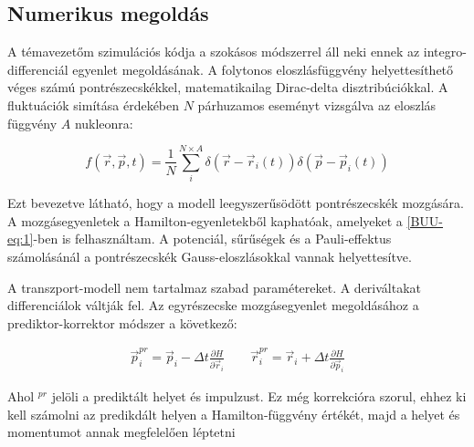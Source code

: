 \documentclass[a4paper,12pt]{article}
\begin{document}
\subsection{ Numerikus megoldás}

\vspace{5mm}

\par A témavezetőm szimulációs kódja a szokásos módszerrel áll neki ennek az integro-differenciál egyenlet megoldásának. A folytonos eloszlásfüggvény helyettesíthető véges számú pontrészecskékkel, matematikailag Dirac-delta disztribúciókkal. A fluktuációk simítása érdekében $N$ párhuzamos eseményt vizsgálva az eloszlás függvény $A$ nukleonra:

\vspace{5mm}

\begin{equation}
	f(\vec{r}, \vec{p}, t) = \frac{1}{N}\sum_{i}^{N \times A} \delta(\vec{r} - \vec{r}_{i}(t))\delta(\vec{p} - \vec{p}_{i}(t))
\end{equation}

\vspace{5mm}

\par Ezt bevezetve látható, hogy a modell leegyszerűsödött pontrészecskék mozgására. A mozgásegyenletek a Hamilton-egyenletekből kaphatóak, amelyeket a \eqref{BUU-eq:1}-ben is felhasználtam. A potenciál, sűrűségek és a Pauli-effektus számolásánál a pontrészecskék Gauss-eloszlásokkal vannak helyettesítve.

\vspace{5mm}

\par A transzport-modell nem tartalmaz szabad paramétereket. A deriváltakat differenciálok váltják fel. Az egyrészecske mozgásegyenlet megoldásához a prediktor-korrektor módszer a következő:

\vspace{5mm}

\begin{gather}
	\vec{p}^{pr}_{i} = \vec{p}_{i} - \Delta t \frac{\partial H}{\partial \vec{r}_{i}} \quad \quad \vec{r}^{pr}_{i} = \vec{r}_{i} + \Delta t \frac{\partial H}{\partial \vec{p}_{i}}
\end{gather}

\vspace{5mm}

\par Ahol $^{pr}$ jelöli a prediktált helyet és impulzust. Ez még korrekcióra szorul, ehhez ki kell számolni az predikdált helyen a Hamilton-függvény értékét, majd a helyet és momentumot annak megfelelően léptetni
\end{document}
